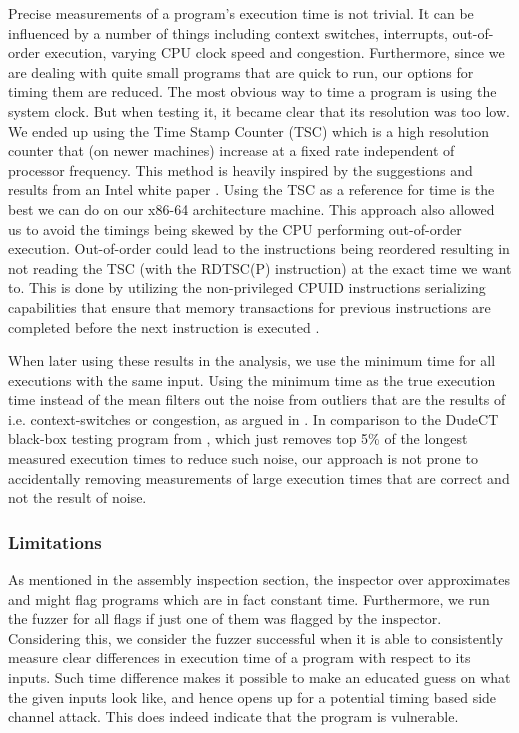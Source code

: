Precise measurements of a program's execution time is not trivial. It can be influenced by a number of things including context switches, interrupts, out-of-order execution, varying CPU clock speed and congestion. Furthermore, since we are dealing with quite small programs that are quick to run, our options for timing them are reduced. The most obvious way to time a program is using the system clock. But when testing it, it became clear that its resolution was too low. We ended up using the Time Stamp Counter (TSC) which is a high resolution counter that (on newer machines) increase at a fixed rate independent of processor frequency. This method is heavily inspired by the suggestions and results from an Intel white paper \citep{intel-benchmark-code-execution}.
Using the TSC as a reference for time is the best we can do on our x86-64 architecture machine.
This approach also allowed us to avoid the timings being skewed by the CPU performing out-of-order execution. Out-of-order could lead to the instructions being reordered resulting in not reading the TSC (with the RDTSC(P) instruction) at the exact time we want to. This is done by utilizing the non-privileged CPUID instructions serializing capabilities that ensure that memory transactions for previous instructions are completed before the next instruction is executed \citep[a]{intel-reference}.

When later using these results in the analysis, we use the minimum time for all executions with the same input. Using the minimum time as the true execution time instead of the mean filters out the noise from outliers that are the results of i.e. context-switches or congestion, as argued in \citep{robust-benchmarking}. In comparison to the DudeCT black-box testing program from \citep{dudect}, which just removes top 5\% of the longest measured execution times to reduce such noise, our approach is not prone to accidentally removing measurements of large execution times that are correct and not the result of noise.

\subsubsection{Limitations}
As mentioned in the assembly inspection section, the inspector over approximates and might flag programs which are in fact constant time. Furthermore, we run the fuzzer for all flags if just one of them was flagged by the inspector.
Considering this, we consider the fuzzer successful when it is able to consistently measure clear differences in execution time of a program with respect to its inputs. Such time difference makes it possible to make an educated guess on what the given inputs look like, and hence opens up for a potential timing based side channel attack. This does indeed indicate that the program is vulnerable.

